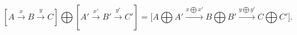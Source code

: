\documentclass[preview]{standalone}
\begin{document}
\begin{center}
$$[A\xrightarrow{x}B\xrightarrow{y}C]\bigoplus[A'\xrightarrow{x'}B'\xrightarrow{y'}C'] = \bigg[A\bigoplus A' \xrightarrow{x\bigoplus x'} B\bigoplus B' \xrightarrow{y\bigoplus y'} C\bigoplus C'\bigg].$$
\end{center}
\end{document}
